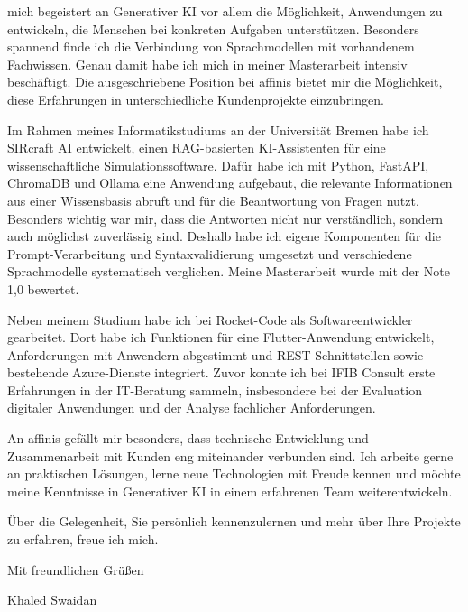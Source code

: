 mich begeistert an Generativer KI vor allem
die Möglichkeit, Anwendungen zu entwickeln,
die Menschen bei konkreten Aufgaben
unterstützen. Besonders spannend finde ich
die Verbindung von Sprachmodellen mit
vorhandenem Fachwissen. Genau damit
habe ich mich in meiner Masterarbeit
intensiv beschäftigt. Die ausgeschriebene
Position bei affinis bietet mir die
Möglichkeit, diese Erfahrungen in
unterschiedliche Kundenprojekte einzubringen.

Im Rahmen meines Informatikstudiums an
der Universität Bremen habe ich SIRcraft AI
entwickelt, einen RAG-basierten KI-Assistenten
für eine wissenschaftliche Simulationssoftware.
Dafür habe ich mit Python, FastAPI, ChromaDB
und Ollama eine Anwendung aufgebaut, die
relevante Informationen aus einer Wissensbasis
abruft und für die Beantwortung von Fragen
nutzt. Besonders wichtig war mir,
dass die Antworten nicht nur verständlich,
sondern auch möglichst zuverlässig sind.
Deshalb habe ich eigene Komponenten
für die Prompt-Verarbeitung und
Syntaxvalidierung umgesetzt und
verschiedene Sprachmodelle systematisch
verglichen. Meine Masterarbeit wurde
mit der Note 1,0 bewertet.

Neben meinem Studium habe ich bei
Rocket-Code als Softwareentwickler
gearbeitet. Dort habe ich Funktionen
für eine Flutter-Anwendung entwickelt,
Anforderungen mit Anwendern abgestimmt
und REST-Schnittstellen sowie bestehende
Azure-Dienste integriert. Zuvor konnte
ich bei IFIB Consult erste Erfahrungen
in der IT-Beratung sammeln, insbesondere
bei der Evaluation digitaler Anwendungen
und der Analyse fachlicher Anforderungen.

An affinis gefällt mir besonders,
dass technische Entwicklung und
Zusammenarbeit mit Kunden eng miteinander
verbunden sind. Ich arbeite gerne an
praktischen Lösungen, lerne neue
Technologien mit Freude kennen und
möchte meine Kenntnisse in Generativer KI
in einem erfahrenen Team weiterentwickeln.

Über die Gelegenheit, Sie persönlich
kennenzulernen und mehr über Ihre
Projekte zu erfahren, freue ich mich.

Mit freundlichen Grüßen

\vspace{4mm}

Khaled Swaidan


